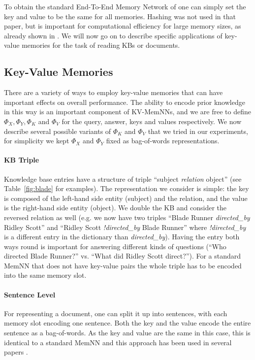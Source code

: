 To obtain the standard End-To-End Memory Network of \cite{sukhbaatar2015end}
one can simply set the key and value to be the same for all memories.
Hashing was not used in that paper,
but is important for computational
efficiency for large memory sizes, as already shown
 in \cite{dodge2015evaluating}.
We will now go on to describe specific applications of
 key-value memories for the task of reading KBs or documents.


\subsection{Key-Value Memories} \label{sec:featuremap}

There are a variety of ways to employ key-value memories %
that can have important effects on overall performance.
The ability to encode prior knowledge in this way is an important
 component of KV-MemNNs, and we are free to define $\Phi_X, \Phi_Y, \Phi_K$ and $\Phi_V$
for the query, answer, keys and values respectively.
We now describe several possible variants of $\Phi_K$ and $\Phi_V$
that we tried in our experiments,
for simplicity we kept $\Phi_X$ and  $\Phi_Y$ fixed as bag-of-words representations.

\paragraph{KB Triple}
Knowledge base entries have a structure of triple ``subject {\em relation} object'' (see Table~\ref{fig:blade} for examples).
The representation we consider is simple:
the key is composed of the left-hand side entity (subject) and the relation,
and the value is the right-hand side entity (object).
We double the KB and consider the reversed relation as well
(e.g. we now have two triples ``Blade Runner {\em directed\_by} Ridley Scott'' and
``Ridley Scott {\em !directed\_by} Blade Runner'' where {\em !directed\_by} is a
different entry in the dictionary than {\em directed\_by}). Having the entry both
ways round is important for answering different kinds of questions
(``Who directed Blade Runner?'' vs. ``What did Ridley Scott direct?'').
For a standard MemNN that does not have key-value pairs the whole triple has to
be encoded into the same memory slot.

\paragraph{Sentence Level}
For representing a document, one can
%
 split it up into sentences, with each memory slot encoding one
sentence.  Both the key and the value encode the entire sentence as a
bag-of-words.  As the key and value are the same in this case, this
is identical to a standard MemNN and this approach has been used in
several papers \citep{weston2015towards,dodge2015evaluating}.

